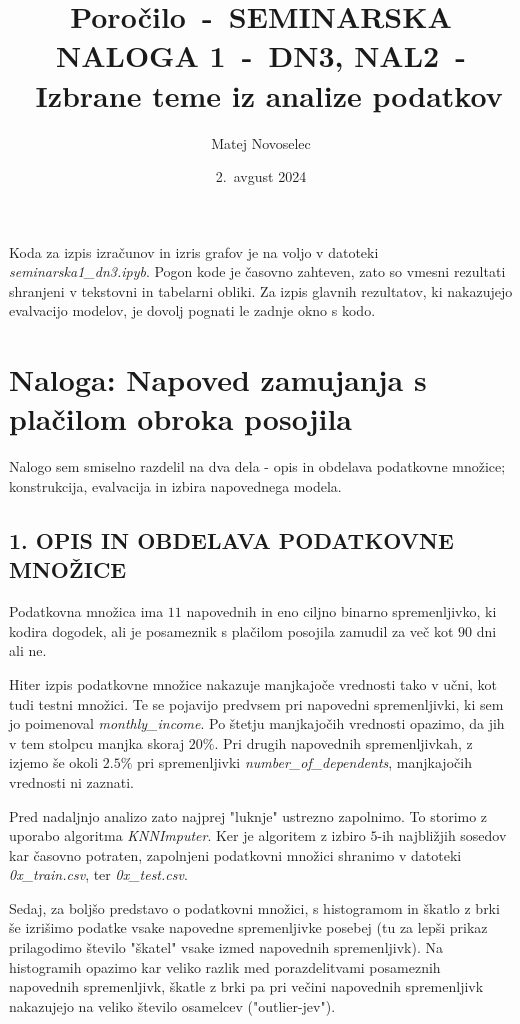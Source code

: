 \documentclass{article}
\begin{document}
\title{Poročilo~-~SEMINARSKA NALOGA 1~-~DN3, NAL2~-~Izbrane teme iz analize podatkov \\
}
\author{
    Matej Novoselec\\
}
\date{2.\ avgust 2024}

\maketitle

Koda za izpis izračunov in izris grafov je na voljo v datoteki \textit{seminarska1\_dn3.ipyb}. 
Pogon kode je časovno zahteven, zato so vmesni rezultati shranjeni v tekstovni in tabelarni obliki. 
Za izpis glavnih rezultatov, ki nakazujejo evalvacijo modelov, je dovolj pognati le zadnje okno s kodo. 

\section*{Naloga: Napoved zamujanja s plačilom obroka posojila}

Nalogo sem smiselno razdelil na dva dela - opis in obdelava podatkovne množice; konstrukcija, evalvacija in izbira napovednega modela.  

\subsection*{1. OPIS IN OBDELAVA PODATKOVNE MNOŽICE}

Podatkovna množica ima $11$ napovednih in eno ciljno binarno spremenljivko, ki kodira dogodek, ali je posameznik s plačilom posojila zamudil za več kot $90$ dni ali ne.

Hiter izpis podatkovne množice nakazuje manjkajoče vrednosti tako v učni, kot tudi testni množici. Te se pojavijo predvsem pri napovedni spremenljivki, ki sem jo poimenoval \textit{monthly\_income}. 
Po štetju manjkajočih vrednosti opazimo, da jih v tem stolpcu manjka skoraj $20\%$. Pri drugih napovednih spremenljivkah, z izjemo še okoli $2.5 \% $ pri spremenljivki \textit{number\_of\_dependents}, manjkajočih vrednosti ni zaznati.  

Pred nadaljnjo analizo zato najprej "luknje" ustrezno zapolnimo. To storimo z uporabo algoritma \textit{KNNImputer}. Ker je algoritem z izbiro $5$-ih najbližjih sosedov kar časovno potraten, zapolnjeni podatkovni množici shranimo v datoteki \textit{0x\_train.csv}, ter \textit{0x\_test.csv}.

Sedaj, za boljšo predstavo o podatkovni množici, s histogramom in škatlo z brki še izrišimo podatke vsake napovedne spremenljivke posebej (tu za lepši prikaz prilagodimo število "škatel" vsake izmed napovednih spremenljivk).
Na histogramih opazimo kar veliko razlik med porazdelitvami posameznih napovednih spremenljivk, škatle z brki pa pri večini napovednih spremenljivk nakazujejo na veliko število osamelcev ("outlier-jev").
\end{document}
